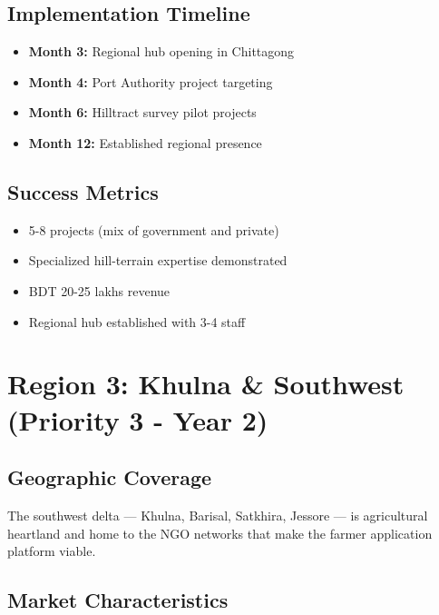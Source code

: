 \subsection{Implementation Timeline}

\begin{itemize}
    \item \textbf{Month 3:} Regional hub opening in Chittagong
    \item \textbf{Month 4:} Port Authority project targeting
    \item \textbf{Month 6:} Hilltract survey pilot projects
    \item \textbf{Month 12:} Established regional presence
\end{itemize}

\subsection{Success Metrics}

\begin{itemize}
    \item 5-8 projects (mix of government and private)
    \item Specialized hill-terrain expertise demonstrated
    \item BDT 20-25 lakhs revenue
    \item Regional hub established with 3-4 staff
\end{itemize}

\section{Region 3: Khulna \& Southwest (Priority 3 - Year 2)}

\subsection{Geographic Coverage}

The southwest delta --- Khulna, Barisal, Satkhira, Jessore --- is agricultural heartland and home to the NGO networks that make the farmer application platform viable.

\subsection{Market Characteristics}

